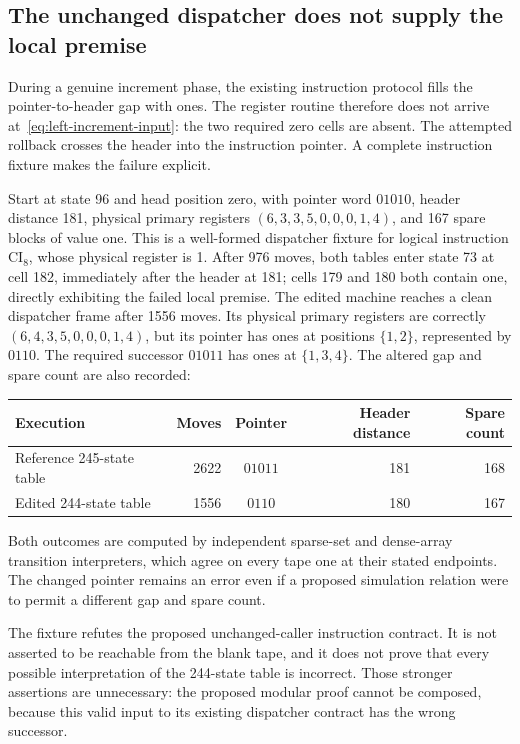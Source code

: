 \subsection{The unchanged dispatcher does not supply the local premise}

During a genuine increment phase, the existing instruction protocol
fills the pointer-to-header gap with ones.  The register routine therefore
does not arrive at~\eqref{eq:left-increment-input}: the two required zero
cells are absent.  The attempted rollback crosses the header into the
instruction pointer.  A complete instruction fixture makes the failure
explicit.

Start at state 96 and head position zero, with pointer word $01010$,
header distance 181, physical primary registers
$(6,3,3,5,0,0,0,1,4)$, and 167 spare blocks of value one.  This is a
well-formed dispatcher fixture for logical instruction $\mathrm{CI}_8$,
whose physical register is 1.  After 976 moves, both tables enter state
73 at cell 182, immediately after the header at 181; cells 179 and 180
both contain one, directly exhibiting the failed local premise.
The edited machine reaches a clean
dispatcher frame after 1556 moves.  Its physical primary registers are
correctly $(6,4,3,5,0,0,0,1,4)$, but its pointer has ones at positions
$\{1,2\}$, represented by $0110$.  The required successor $01011$ has
ones at $\{1,3,4\}$.  The altered gap and spare count are also recorded:
\begin{center}
\begin{tabular}{l|r|c|r|r}
Execution & Moves & Pointer & Header distance & Spare count\\
\hline
Reference 245-state table & 2622 & $01011$ & 181 & 168\\
Edited 244-state table & 1556 & $0110$ & 180 & 167
\end{tabular}
\end{center}
Both outcomes are computed by independent sparse-set and dense-array
transition interpreters, which agree on every tape one at their stated
endpoints.  The changed pointer remains an error even if a proposed
simulation relation were to permit a different gap and spare count.

The fixture refutes the proposed unchanged-caller instruction contract.
It is not asserted to be reachable from the blank tape, and it does not
prove that every possible interpretation of the 244-state table is
incorrect.  Those stronger assertions are unnecessary: the proposed
modular proof cannot be composed, because this valid input to its
existing dispatcher contract has the wrong successor.

